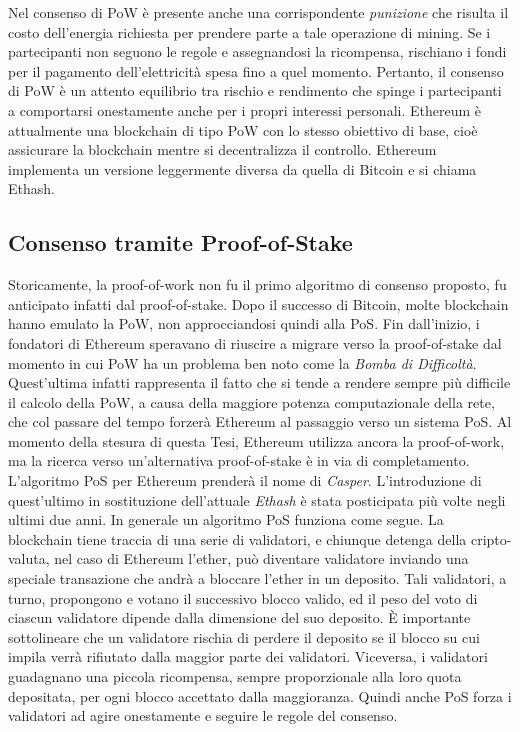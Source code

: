 Nel consenso di PoW è presente anche una corrispondente \textit{punizione} che risulta il costo dell'energia richiesta per prendere parte a tale operazione di mining. Se i partecipanti non seguono le regole e assegnandosi la ricompensa, rischiano i fondi per il pagamento dell'elettricità spesa fino a quel momento. Pertanto, il consenso di PoW è un attento equilibrio tra rischio e rendimento che spinge i partecipanti a comportarsi onestamente anche per i propri interessi personali. Ethereum è attualmente una blockchain di tipo PoW con lo stesso obiettivo di base, cioè assicurare la blockchain mentre si decentralizza il controllo. Ethereum implementa un versione leggermente diversa da quella di Bitcoin e si chiama Ethash.

\subsection{Consenso tramite Proof-of-Stake}
Storicamente, la proof-of-work non fu il primo algoritmo di consenso proposto, fu anticipato infatti dal proof-of-stake. Dopo il successo di Bitcoin, molte blockchain hanno emulato la PoW, non approcciandosi quindi alla PoS. Fin dall'inizio, i fondatori di Ethereum speravano di riuscire a migrare verso la proof-of-stake dal momento in cui PoW ha un problema ben noto come la \textit{Bomba di Difficoltà}. Quest'ultima infatti rappresenta il fatto che si tende a rendere sempre più difficile il calcolo della PoW, a causa della maggiore potenza computazionale della rete, che col passare del tempo forzerà Ethereum al passaggio verso un sistema PoS. Al momento della stesura di questa Tesi, Ethereum utilizza ancora la proof-of-work, ma la ricerca verso un'alternativa proof-of-stake è in via di completamento. L'algoritmo PoS per Ethereum prenderà il nome di \textit{Casper}. L'introduzione di quest'ultimo in sostituzione dell'attuale \textit{Ethash} è stata posticipata più volte negli ultimi due anni. In generale un algoritmo PoS funziona come segue. La blockchain tiene traccia di una serie di validatori, e chiunque detenga della cripto-valuta, nel caso di Ethereum l'ether, può diventare validatore inviando una speciale transazione che andrà a bloccare l'ether in un deposito. Tali validatori, a turno, propongono e votano il successivo blocco valido, ed il peso del voto di ciascun validatore dipende dalla dimensione del suo deposito. \`E importante sottolineare che un validatore rischia di perdere il deposito se il blocco su cui impila verrà rifiutato dalla maggior parte dei validatori. Viceversa, i validatori guadagnano una piccola ricompensa, sempre proporzionale alla loro quota depositata, per ogni blocco accettato dalla maggioranza. Quindi anche PoS forza i validatori ad agire onestamente e seguire le regole del consenso.

